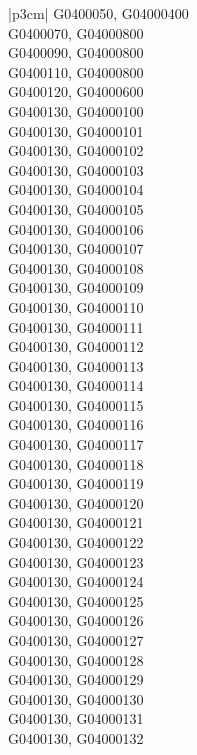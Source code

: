 \begin{customLongTable}{ |p{3cm}| }
G0400050, G04000400 \\ \hline
G0400070, G04000800 \\ \hline
G0400090, G04000800 \\ \hline
G0400110, G04000800 \\ \hline
G0400120, G04000600 \\ \hline
G0400130, G04000100 \\ \hline
G0400130, G04000101 \\ \hline
G0400130, G04000102 \\ \hline
G0400130, G04000103 \\ \hline
G0400130, G04000104 \\ \hline
G0400130, G04000105 \\ \hline
G0400130, G04000106 \\ \hline
G0400130, G04000107 \\ \hline
G0400130, G04000108 \\ \hline
G0400130, G04000109 \\ \hline
G0400130, G04000110 \\ \hline
G0400130, G04000111 \\ \hline
G0400130, G04000112 \\ \hline
G0400130, G04000113 \\ \hline
G0400130, G04000114 \\ \hline
G0400130, G04000115 \\ \hline
G0400130, G04000116 \\ \hline
G0400130, G04000117 \\ \hline
G0400130, G04000118 \\ \hline
G0400130, G04000119 \\ \hline
G0400130, G04000120 \\ \hline
G0400130, G04000121 \\ \hline
G0400130, G04000122 \\ \hline
G0400130, G04000123 \\ \hline
G0400130, G04000124 \\ \hline
G0400130, G04000125 \\ \hline
G0400130, G04000126 \\ \hline
G0400130, G04000127 \\ \hline
G0400130, G04000128 \\ \hline
G0400130, G04000129 \\ \hline
G0400130, G04000130 \\ \hline
G0400130, G04000131 \\ \hline
G0400130, G04000132 \\ \hline

\end{customLongTable}
